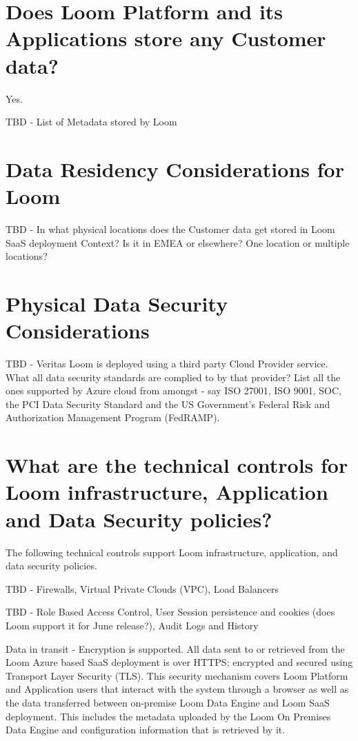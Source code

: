 \documentclass[letterpaper,10pt,english]{sphinxmanual}
\begin{document}
\section{Does Loom Platform and its Applications store any Customer data?}
\label{\detokenize{loom_trbs_faq:does-loom-platform-and-its-applications-store-any-customer-data}}
Yes.

TBD - List of Metadata stored by Loom


\section{Data Residency Considerations for Loom}
\label{\detokenize{loom_trbs_faq:data-residency-considerations-for-loom}}
TBD - In what physical locations does the Customer data get stored in Loom SaaS deployment Context?  Is it in EMEA or elsewhere? One location or multiple locations?


\section{Physical Data Security Considerations}
\label{\detokenize{loom_trbs_faq:physical-data-security-considerations}}
TBD - Veritas Loom is deployed using a third party Cloud Provider service.  What all data security standards are complied to by that provider?  List all the ones supported by Azure cloud from amongst - say ISO 27001, ISO 9001, SOC, the PCI Data Security Standard and the US Government’s Federal Risk and Authorization Management Program (FedRAMP).


\section{What are the technical controls for Loom infrastructure, Application and Data Security policies?}
\label{\detokenize{loom_trbs_faq:what-are-the-technical-controls-for-loom-infrastructure-application-and-data-security-policies}}
The following technical controls support Loom infrastructure, application, and data security policies.

TBD - Firewalls, Virtual Private Clouds (VPC), Load Balancers

TBD - Role Based Access Control, User Session persistence and cookies (does Loom support it for June release?), Audit Logs and History

Data in transit - Encryption is supported. All data sent to or retrieved from the Loom Azure based SaaS deployment is over HTTPS; encrypted and secured using Transport Layer Security (TLS). This security mechanism covers Loom Platform and Application users that interact with the system through a browser as well as the data transferred between on-premise Loom Data Engine and Loom SaaS deployment. This includes the metadata uploaded by the Loom On Premises Data Engine and configuration information that is retrieved by it.
\end{document}
